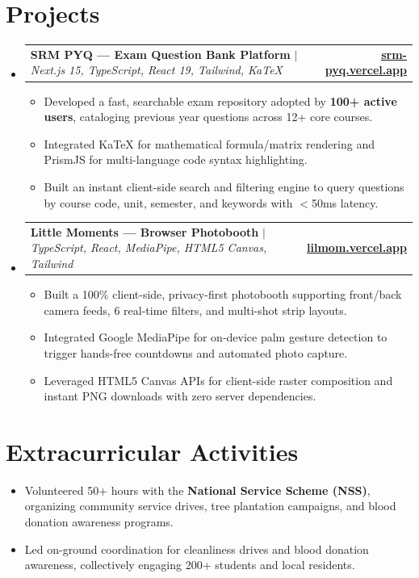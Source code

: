 \documentclass[letterpaper,10pt]{article}
\makeatletter
\newcommand{\resumeItem}[1]{
  \item\small{
    {#1 \vspace{-2pt}}
  }
}
\newcommand{\resumeProjectHeading}[2]{
    \item
    \begin{tabular*}{1.0\textwidth}[t]{l@{\extracolsep{\fill}}r}
      \small#1 & \textbf{\small #2}\\
    \end{tabular*}\vspace{-4pt}
}
\newcommand{\resumeSubHeadingListStart}{\begin{itemize}[leftmargin=0.0in, label={}]}
\newcommand{\resumeSubHeadingListEnd}{\end{itemize}}
\newcommand{\resumeItemListStart}{\begin{itemize}[leftmargin=0.15in, label=\raisebox{0.15ex}{\tiny$\bullet$}, itemsep=1.5pt]}
\newcommand{\resumeItemListEnd}{\end{itemize}\vspace{-3pt}}
\makeatother
\begin{document}
\section{Projects}
\vspace{-4pt}
    \resumeSubHeadingListStart
      \resumeProjectHeading
          {\textbf{SRM PYQ --- Exam Question Bank Platform} $|$ \emph{Next.js 15, TypeScript, React 19, Tailwind, KaTeX}}{\href{https://srm-pyq.vercel.app/}{\underline{srm-pyq.vercel.app}}}
          \resumeItemListStart
            \resumeItem{Developed a fast, searchable exam repository adopted by \textbf{100+ active users}, cataloging previous year questions across 12+ core courses.}
            \resumeItem{Integrated KaTeX for mathematical formula/matrix rendering and PrismJS for multi-language code syntax highlighting.}
            \resumeItem{Built an instant client-side search and filtering engine to query questions by course code, unit, semester, and keywords with $<$50ms latency.}
          \resumeItemListEnd
      \resumeProjectHeading
          {\textbf{Little Moments --- Browser Photobooth} $|$ \emph{TypeScript, React, MediaPipe, HTML5 Canvas, Tailwind}}{\href{https://lilmom.vercel.app/}{\underline{lilmom.vercel.app}}}
          \resumeItemListStart
            \resumeItem{Built a 100\% client-side, privacy-first photobooth supporting front/back camera feeds, 6 real-time filters, and multi-shot strip layouts.}
            \resumeItem{Integrated Google MediaPipe for on-device palm gesture detection to trigger hands-free countdowns and automated photo capture.}
            \resumeItem{Leveraged HTML5 Canvas APIs for client-side raster composition and instant PNG downloads with zero server dependencies.}
          \resumeItemListEnd
    \resumeSubHeadingListEnd
\vspace{-4pt}

\section{Extracurricular Activities}
    \resumeSubHeadingListStart
        \resumeItemListStart
            \resumeItem{Volunteered 50+ hours with the \textbf{National Service Scheme (NSS)}, organizing community service drives, tree plantation campaigns, and blood donation awareness programs.}
            \resumeItem{Led on-ground coordination for cleanliness drives and blood donation awareness, collectively engaging 200+ students and local residents.}
        \resumeItemListEnd
    \resumeSubHeadingListEnd
\end{document}
